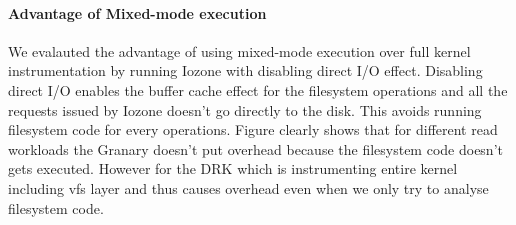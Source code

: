 
\paragraph{Advantage of Mixed-mode execution} We evalauted the advantage of using mixed-mode execution over full kernel instrumentation by running Iozone with disabling direct I/O effect. Disabling direct I/O enables the buffer cache effect for the filesystem operations and all the requests issued by Iozone doesn't go directly to the disk. This avoids running filesystem code for every operations. Figure clearly shows that for different read workloads the Granary doesn't put overhead because the filesystem code doesn't gets executed. However for the DRK which is instrumenting entire kernel including vfs layer and thus causes overhead even when we only try to analyse filesystem code.














